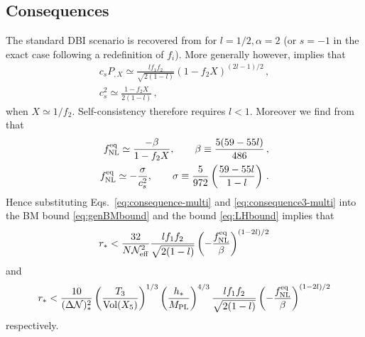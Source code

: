 \subsection{Consequences}
\label{sec:consequences-multi}

The standard DBI scenario is recovered from  for
$l=1/2, \alpha = 2$ (or $s=-1$ in the exact case following a redefinition of
$f_i$). 
More generally however,  implies that  
% 
\begin{eqnarray}
\label{eq:consequence-multi}
c_sP_{,X} \simeq \frac{l f_1 f_2}{\sqrt{2(1-l)}} \left( 
1- f_2X \right)^{(2l-1)/2} \,,
\\
c_s^2 \simeq \frac{1-f_2X}{2(1-l)} \,,
\end{eqnarray}
% 
when $X \simeq 1/f_2$. Self-consistency therefore
requires $l<1$. Moreover
we find from  that
%  
\begin{eqnarray}
\label{eq:consequence3-multi}
f_{\mathrm{NL}}^{\mathrm{eq}} \simeq \frac{-\beta}{1-f_2X} , \qquad \beta \equiv \frac{5(59-55l)}{486}
\,,
\\
\label{eq:consequence4-multi}
f_{\mathrm{NL}}^{\mathrm{eq}} \simeq -\frac{\sigma}{c_s^2}, \qquad \sigma \equiv 
\frac{5}{972} \left( \frac{59-55l}{1-l} \right) \,.
\end{eqnarray}
% 
Hence substituting Eqs.~\eqref{eq:consequence-multi} and
\eqref{eq:consequence3-multi} 
into the BM bound \eqref{eq:genBMbound} and the bound \eqref{eq:LHbound}
implies that
%  
\begin{equation}
\label{eq:weakBM-multi}
r_*< \frac{32}{N \mathcal{N}_\mathrm{eff}^2} \frac{l f_1 f_2}{\sqrt{2(1-l)}}
\left( -\frac{f_{\mathrm{NL}}^{\mathrm{eq}}}{\beta} \right)^{(1-2l)/2}
\end{equation}
% 
and
%  
\begin{equation}
\label{eq:weakLH-multi}
r_* < \frac{10}{(\Delta \mathcal{N})_*^2} \left( \frac{T_3}{\mathrm{Vol} (X_5)} \right)^{1/3} 
\left( \frac{h_*}{M_{\mathrm{PL}}} \right)^{4/3}
\frac{l f_1 f_2}{\sqrt{2(1-l)}}
\left( -\frac{f_{\mathrm{NL}}^{\mathrm{eq}}}{\beta} \right)^{(1-2l)/2}
\end{equation}
% 
respectively. 


